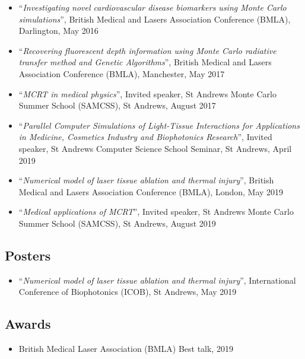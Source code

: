 \documentclass[10pt,a4paper,twoside]{book}
\begin{document}
\begin{itemize}
\item ``\textit{Investigating novel cardiovascular disease biomarkers using Monte Carlo simulations}'', British Medical and Lasers Association Conference (BMLA), Darlington, May 2016
\item ``\textit{Recovering fluorescent depth information using Monte Carlo radiative transfer method and Genetic Algorithms}'', British Medical and Lasers Association Conference (BMLA), Manchester, May 2017
\item ``\textit{MCRT in medical physics}'', Invited speaker, St Andrews Monte Carlo Summer School (SAMCSS), St Andrews, August 2017
\item ``\textit{Parallel Computer Simulations of Light-Tissue Interactions for Applications in Medicine, Cosmetics Industry and Biophotonics Research}'', Invited speaker, St Andrews Computer Science School Seminar, St Andrews, April 2019
\item ``\textit{Numerical model of laser tissue ablation and thermal injury}'', British Medical and Lasers Association Conference (BMLA), London, May 2019
\item ``\textit{Medical applications of MCRT}'', Invited speaker, St Andrews Monte Carlo Summer School (SAMCSS), St Andrews, August 2019
\end{itemize}


\subsection*{Posters}

\begin{itemize}
\item ``\textit{Numerical model of laser tissue ablation and thermal injury}'', International Conference of Biophotonics (ICOB), St Andrews, May 2019
\end{itemize}


\subsection*{Awards}

\begin{itemize}
\item British Medical Laser Association (BMLA) Best talk, 2019
\end{itemize}
\end{document}
